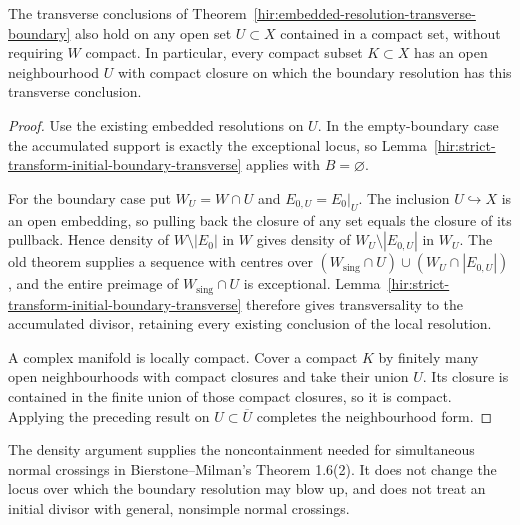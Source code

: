 \begin{theorem}
\label{hir:embedded-resolution-transverse-local}
\leanok
The transverse conclusions of Theorem~\ref{hir:embedded-resolution-transverse-boundary} also hold on any open set \(U\subset X\) contained in a compact set, without requiring \(W\) compact. In particular, every compact subset \(K\subset X\) has an open neighbourhood \(U\) with compact closure on which the boundary resolution has this transverse conclusion.
\end{theorem}
\begin{proof}
Use the existing embedded resolutions on \(U\). In the empty-boundary case the accumulated support is exactly the exceptional locus, so Lemma~\ref{hir:strict-transform-initial-boundary-transverse} applies with \(B=\varnothing\).

For the boundary case put \(W_U=W\cap U\) and \(E_{0,U}=E_0|_U\). The inclusion \(U\hookrightarrow X\) is an open embedding, so pulling back the closure of any set equals the closure of its pullback. Hence density of \(W\setminus|E_0|\) in \(W\) gives density of \(W_U\setminus|E_{0,U}|\) in \(W_U\). The old theorem supplies a sequence with centres over \((W_{\mathrm{sing}}\cap U)\cup(W_U\cap|E_{0,U}|)\), and the entire preimage of \(W_{\mathrm{sing}}\cap U\) is exceptional. Lemma~\ref{hir:strict-transform-initial-boundary-transverse} therefore gives transversality to the accumulated divisor, retaining every existing conclusion of the local resolution.

A complex manifold is locally compact. Cover a compact \(K\) by finitely many open neighbourhoods with compact closures and take their union \(U\). Its closure is contained in the finite union of those compact closures, so it is compact. Applying the preceding result on \(U\subset\overline U\) completes the neighbourhood form.
\end{proof}

\begin{remark}
The density argument supplies the noncontainment needed for simultaneous normal crossings in Bierstone--Milman's Theorem 1.6(2). It does not change the locus over which the boundary resolution may blow up, and does not treat an initial divisor with general, nonsimple normal crossings.
\end{remark}
